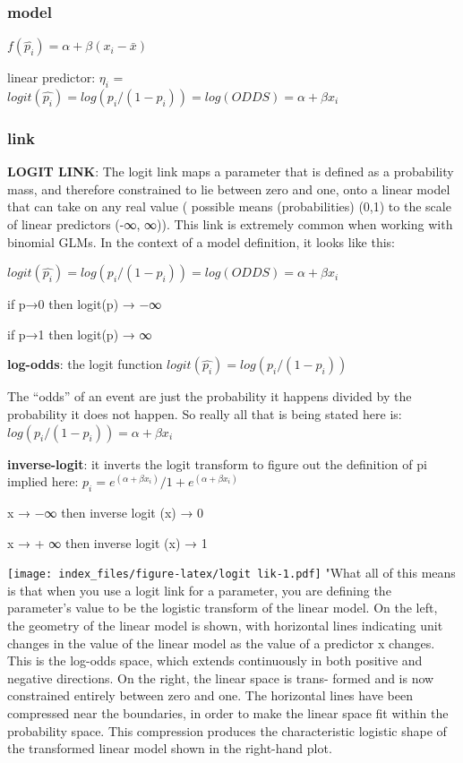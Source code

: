 \documentclass[
]{article}
\begin{document}
\hypertarget{model-1}{%
\subsubsection{model}\label{model-1}}

\(f(\hat{p_i})=\alpha +\beta(x_i-\bar{x})\)

linear predictor: \(\eta_i\) =
\(logit(\hat{p_i}) = log(p_i/(1-p_i)) = log(ODDS) =\alpha +\beta x_i\)

\hypertarget{link-1}{%
\subsubsection{link}\label{link-1}}

\textbf{LOGIT LINK}: The logit link maps a parameter that is defined as
a probability mass, and therefore constrained to lie between zero and
one, onto a linear model that can take on any real value ( possible
means (probabilities) (0,1) to the scale of linear predictors (-∞, ∞)).
This link is extremely common when working with binomial GLMs. In the
context of a model definition, it looks like this:

\(logit(\hat{p_i}) = log(p_i/(1-p_i)) = log(ODDS) =\alpha +\beta x_i\)

if p→0 then logit(p) → −∞

if p→1 then logit(p) → ∞

\textbf{log-odds}: the logit function
\(logit(\hat{p_i}) = log(p_i/(1-p_i))\)

The ``odds'' of an event are just the probability it happens divided by
the probability it does not happen. So really all that is being stated
here is: \(log(p_i/(1-p_i))= \alpha +\beta x_i\)

\textbf{inverse-logit}: it inverts the logit transform to figure out the
definition of pi implied here:
\(p_i = e^{(\alpha +\beta x_i)} / 1 + e^{(\alpha +\beta x_i)}\)

x → −∞ then inverse logit (x) → 0

x → + ∞ then inverse logit (x) → 1

\texttt{[image: index\_files/figure-latex/logit lik-1.pdf]} "What all of
this means is that when you use a logit link for a parameter, you are
defining the parameter's value to be the logistic transform of the
linear model. On the left, the geometry of the linear model is shown,
with horizontal lines indicating unit changes in the value of the linear
model as the value of a predictor x changes. This is the log-odds space,
which extends continuously in both positive and negative directions. On
the right, the linear space is trans- formed and is now constrained
entirely between zero and one. The horizontal lines have been compressed
near the boundaries, in order to make the linear space fit within the
probability space. This compression produces the characteristic logistic
shape of the transformed linear model shown in the right-hand plot.
\end{document}
